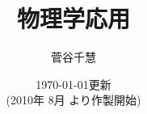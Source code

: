 ﻿%
    \title{
        \Huge{物理学応用}
    }

    \author{
        菅谷\;\;\;千慧
    }

    \date{
        \today \quad 更新\\
        {\small (2010年 8月 より作製開始)}
    }
    \par
